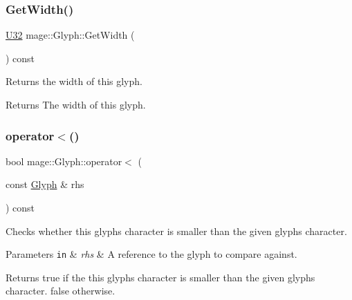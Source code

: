 \subsubsection{\texorpdfstring{Get\+Width()}{GetWidth()}}
{\footnotesize\ttfamily \hyperlink{namespacemage_a41c104c036fba3756a74e19f793eeaa1}{U32} mage\+::\+Glyph\+::\+Get\+Width (\begin{DoxyParamCaption}{ }\end{DoxyParamCaption}) const\hspace{0.3cm}{\ttfamily [noexcept]}}

Returns the width of this glyph.

\begin{DoxyReturn}{Returns}
The width of this glyph. 
\end{DoxyReturn}
\hypertarget{structmage_1_1_glyph_a7bb41307f74973e4bc547193dedc8dcc}{}\label{structmage_1_1_glyph_a7bb41307f74973e4bc547193dedc8dcc} 
\subsubsection{\texorpdfstring{operator$<$()}{operator<()}\hspace{0.1cm}{\footnotesize\ttfamily [1/2]}}
{\footnotesize\ttfamily bool mage\+::\+Glyph\+::operator$<$ (\begin{DoxyParamCaption}\item[{const \hyperlink{structmage_1_1_glyph}{Glyph} \&}]{rhs }\end{DoxyParamCaption}) const\hspace{0.3cm}{\ttfamily [noexcept]}}

Checks whether this glyph\textquotesingle{}s character is smaller than the given glyph\textquotesingle{}s character.


\begin{DoxyParams}[1]{Parameters}
\mbox{\tt in}  & {\em rhs} & A reference to the glyph to compare against. \\
\hline
\end{DoxyParams}
\begin{DoxyReturn}{Returns}
{\ttfamily true} if the this glyph\textquotesingle{}s character is smaller than the given glyph\textquotesingle{}s character. {\ttfamily false} otherwise. 
\end{DoxyReturn}
\hypertarget{structmage_1_1_glyph_ad8e9835022217afef429f38891bba80e}{}\label{structmage_1_1_glyph_ad8e9835022217afef429f38891bba80e} 
